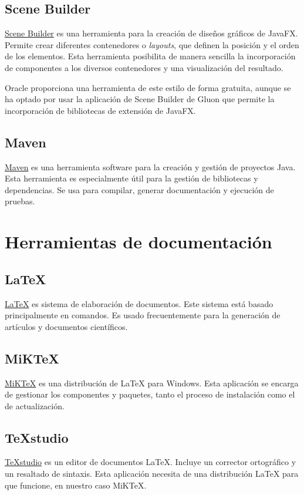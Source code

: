 \subsection{Scene Builder}
\href{https://gluonhq.com/products/scene-builder/}{Scene Builder} es una herramienta para la creación de diseños gráficos de JavaFX. Permite crear diferentes contenedores o \emph{layouts}, que definen la posición y el orden de los elementos. Esta herramienta posibilita de manera sencilla la incorporación de componentes a los diversos contenedores y una visualización del resultado.

Oracle proporciona una herramienta de este estilo de forma gratuita, aunque se ha optado por usar la aplicación de Scene Builder de Gluon que permite la incorporación de bibliotecas de extensión de JavaFX.

\subsection{Maven}
\href{http://maven.apache.org/}{Maven} es una herramienta software para la creación y gestión de proyectos Java. Esta herramienta es especialmente útil para la gestión de bibliotecas y dependencias. Se usa para compilar, generar documentación y ejecución de pruebas.

\section{Herramientas de documentación}
\subsection{\LaTeX}
\href{https://www.latex-project.org/}{\LaTeX} es sistema de elaboración de documentos. Este sistema está basado principalmente en comandos. Es usado frecuentemente para la generación de artículos y documentos científicos.

\subsection{MiKTeX}
\href{https://miktex.org}{MiKTeX} es una distribución de \LaTeX{} para Windows. Esta aplicación se encarga de gestionar los componentes y paquetes, tanto el proceso de instalación como el de actualización.

\subsection{TeXstudio}
\href{https://www.texstudio.org/}{TeXstudio} es un editor de documentos \LaTeX{}. Incluye un corrector ortográfico y un resaltado de sintaxis. Esta aplicación necesita de una distribución \LaTeX{} para que funcione, en nuestro caso MiKTeX.

